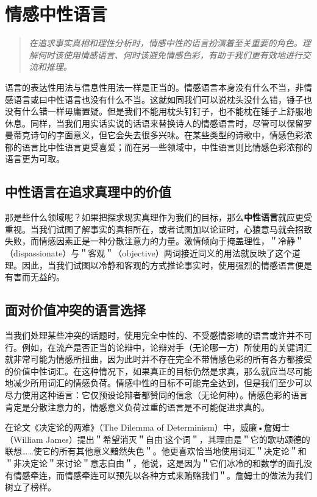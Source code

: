 \section{情感中性语言}

\begin{quotation}
\textit{在追求事实真相和理性分析时，情感中性的语言扮演着至关重要的角色。理解何时该使用情感语言、何时该避免情感色彩，有助于我们更有效地进行交流和推理。}
\end{quotation}

语言的表达性用法与信息性用法一样是正当的。情感语言本身没有什么不当，非情感语言或曰中性语言也没有什么不当。这就如同我们可以说枕头没什么错，锤子也没有什么错一样毋庸置疑。但是我们不能用枕头钉钉子，也不能枕在锤子上舒服地休息。同样，当我们用实话实说的话语来替换诗人的情感语言时，尽管可以保留罗曼蒂克诗句的字面意义，但它会失去很多兴味。在某些类型的诗歌中，情感色彩浓郁的语言比中性语言更受喜爱；而在另一些领域中，中性语言则比情感色彩浓郁的语言更为可取。

\subsection{中性语言在追求真理中的价值}

那是些什么领域呢？如果把探求现实真理作为我们的目标，那么\textbf{中性语言}就应更受重视。当我们试图了解事实的真相所在，或者试图加以论证时，心猿意马就会招致失败，而情感因素正是一种分散注意力的力量。激情倾向于掩盖理性，＂冷静＂（dispassionate）与＂客观＂（objective）两词接近同义的用法就反映了这个道理。因此，当我们试图以冷静和客观的方式推论事实时，使用强烈的情感语言便是有害而无益的。

\subsection{面对价值冲突的语言选择}

当我们处理某些冲突的话题时，使用完全中性的、不受感情影响的语言或许并不可行。例如，在流产是否正当的论辩中，论辩对手（无论哪一方）所使用的关键词汇就非常可能为情感所扭曲，因为此时并不存在完全不带情感色彩的所有各方都接受的价值中性词汇。在这种情况下，如果真正的目标仍然是求真，那么就应当尽可能地减少所用词汇的情感负荷。情感中性的目标不可能完全达到，但是我们至少可以尽力使用这种语言：它仅预设论辩者都赞同的信念（无论何种）。情感色彩的语言肯定是分散注意力的，情感意义负荷过重的语言是不可能促进求真的。

在论文《决定论的两难》（The Dilemma of Determinism）中，威廉•詹姆士（William James）提出＂希望消灭＂自由'这个词＂，其理由是＂它的歌功颂德的联想……使它的所有其他意义黯然失色＂。他更喜欢恰当地使用词汇＂决定论＂和＂非决定论＂来讨论＂意志自由＂，他说，这是因为＂它们冰冷的和数学的面孔没有情感牵连，而情感牵连可以预先以各种方式来贿赂我们＂。詹姆士的做法为我们树立了榜样。

